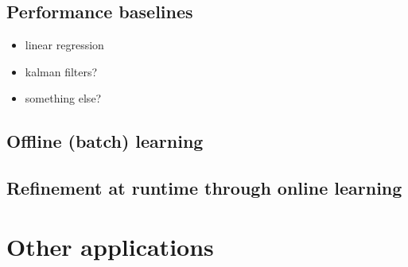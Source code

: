 \subsection{Performance baselines}
\begin{itemize}
	\item linear regression
	\item kalman filters?
	\item something else?
\end{itemize}
\subsection{Offline (batch) learning}
\subsection{Refinement at runtime through online learning}
\section{Other applications}